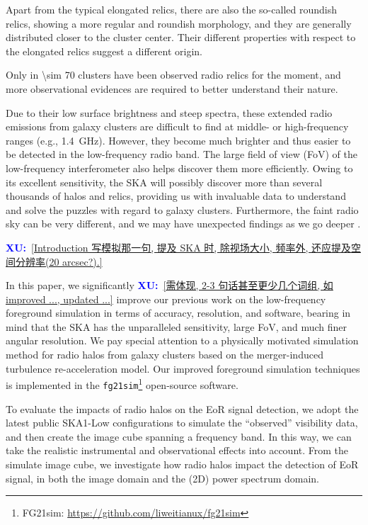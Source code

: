 \documentclass[modern]{aastex61}
\newcommand{\XU}[1]{\textcolor{blue}{\textbf{XU:}}~\uline{#1}}
\begin{document}
\begin{description}
    Apart from the typical elongated relics, there are also the so-called
    roundish relics, showing a more regular and roundish morphology,
    and they are generally distributed closer to the cluster center.
    Their different properties with respect to the elongated relics
    suggest a different origin.

    Only in \num{\sim 70} clusters have been observed radio relics
    \citep[their Table 1]{nuza2017} for the moment, and more observational
    evidences are required to better understand their nature.
\end{description}

Due to their low surface brightness and steep spectra, these extended
radio emissions from galaxy clusters are difficult to find at middle-
or high-frequency ranges (e.g., \SI{1.4}{\GHz}).
However, they become much brighter and thus easier to be detected in
the low-frequency radio band.  The large field of view (FoV) of the
low-frequency interferometer also helps discover them more efficiently.
Owing to its excellent sensitivity, the SKA will possibly discover more
than several thousands of halos and relics, providing us with invaluable
data to understand and solve the puzzles with regard to galaxy clusters.
Furthermore, the faint radio sky can be very different, and we may have
unexpected findings as we go deeper \citep{padovani2016rev,herreraRuiz2017}.

\XU{[Introduction 写模拟那一句, 提及 SKA 时, 除视场大小, 频率外,
  还应提及空间分辨率(20 arcsec?).]}

In this paper, we significantly \XU{[需体现, 2-3 句话甚至更少几个词组,
  如 improved ..., updated ...]}
improve our previous work \citep{wang2010}
on the low-frequency foreground simulation in terms of accuracy, resolution,
and software, bearing in mind that the SKA has the unparalleled sensitivity,
large FoV, and much finer angular resolution.
We pay special attention to a physically motivated simulation method
for radio halos from galaxy clusters based on the merger-induced
turbulence re-acceleration model.
Our improved foreground simulation techniques is implemented in the
\texttt{fg21sim}\footnote{FG21sim:
  \url{https://github.com/liweitianux/fg21sim}} open-source software.

To evaluate the impacts of radio halos on the EoR signal detection,
we adopt the latest public SKA1-Low configurations to simulate the
\enquote{observed} visibility data, and then create the image cube
spanning a frequency band.
In this way, we can take the realistic instrumental and observational
effects into account.
From the simulate image cube, we investigate how radio halos impact
the detection of EoR signal, in both the image domain and the (2D)
power spectrum domain.
\end{document}
